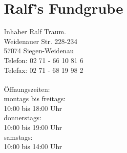 \section{Ralf's Fundgrube}
Inhaber Ralf Traum.\\
Weidenauer Str. 228-234\\
57074 Siegen-Weidenau\\
Telefon: 02 71 - 66 10 81 6\\
Telefax: 02 71 - 68 19 98 2\\
\\
Öffnungszeiten:\\
montags bis freitags:\\
10:00 bis 18:00 Uhr\\
donnerstags:\\
10:00 bis 19:00 Uhr\\
samstags:\\
10:00 bis 14:00 Uhr